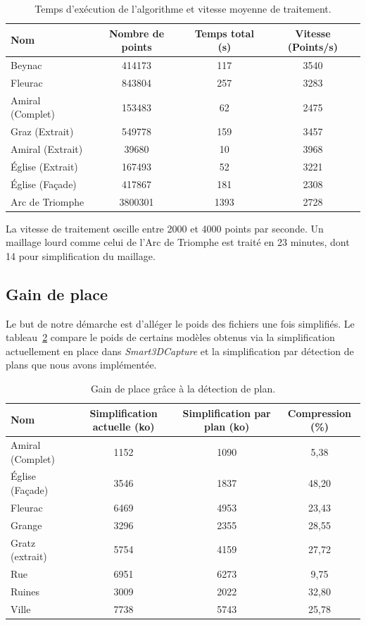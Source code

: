 ﻿\documentclass[12pt, twoside]{article}
\begin{document}
\begin{table}
\centering
\begin{tabular}{|l|c|c|c|}
    \hline
    Nom & Nombre de points & Temps total (s) & Vitesse (Points/s) \tabularnewline
    \hline
    Beynac & 414173 & 117 & 3540 \tabularnewline
    \hline
    Fleurac & 843804 & 257 & 3283 \tabularnewline
    \hline
    Amiral (Complet) & 153483 & 62 & 2475 \tabularnewline
    \hline
    Graz (Extrait) & 549778 & 159 & 3457 \tabularnewline
    \hline
    Amiral (Extrait) & 39680 & 10 & 3968 \tabularnewline
    \hline
    Église (Extrait) & 167493 & 52 & 3221 \tabularnewline
    \hline
    Église (Façade) & 417867 & 181 & 2308 \tabularnewline
    \hline
    Arc de Triomphe & 3800301 & 1393 & 2728 \tabularnewline
    \hline
\end{tabular}
\caption{Temps d'exécution de l'algorithme et vitesse moyenne de traitement.}
\label{table:vitesse}
\end{table}

La vitesse de traitement oscille entre 2000 et 4000 points par seconde. Un maillage lourd comme celui de l'Arc de Triomphe est traité en 23 minutes, dont 14 pour simplification du maillage.

\subsection{Gain de place}
Le but de notre démarche est d'alléger le poids des fichiers une fois simplifiés. Le tableau~\ref{table:gain} compare le poids de certains modèles obtenus via la simplification actuellement en place dans \textit{Smart3DCapture} et la simplification par détection de plans que nous avons implémentée.

\begin{table}
\centering
\begin{tabular}{|l|c|c|c|}
    \hline
    Nom & Simplification actuelle (ko) & Simplification par plan (ko) & Compression (\%) \tabularnewline
    \hline
    Amiral (Complet) & 1152 & 1090 & 5,38 \tabularnewline
    \hline
    Église (Façade) & 3546 & 1837 & 48,20 \tabularnewline
    \hline
    Fleurac & 6469 & 4953 & 23,43 \tabularnewline
    \hline
    Grange & 3296 & 2355 & 28,55 \tabularnewline
    \hline
    Gratz (extrait) & 5754 & 4159 & 27,72 \tabularnewline
    \hline
    Rue & 6951 & 6273 & 9,75 \tabularnewline
    \hline
    Ruines & 3009 & 2022 & 32,80 \tabularnewline
    \hline
    Ville & 7738 & 5743 & 25,78 \tabularnewline
    \hline
\end{tabular}
\caption{Gain de place grâce à la détection de plan.}
\label{table:gain}
\end{table}
\end{document}

